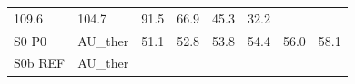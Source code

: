 \documentclass[]{article}
\begin{document}
\begin{longtable}[]{@{}llrrrrrr@{}}
\begin{minipage}[t]{0.09\columnwidth}
109.6\strut
\end{minipage} & \begin{minipage}[t]{0.09\columnwidth}\raggedleft\strut
104.7\strut
\end{minipage} & \begin{minipage}[t]{0.09\columnwidth}\raggedleft\strut
91.5\strut
\end{minipage} & \begin{minipage}[t]{0.09\columnwidth}\raggedleft\strut
66.9\strut
\end{minipage} & \begin{minipage}[t]{0.09\columnwidth}\raggedleft\strut
45.3\strut
\end{minipage} & \begin{minipage}[t]{0.09\columnwidth}\raggedleft\strut
32.2\strut
\end{minipage}\tabularnewline
\begin{minipage}[t]{0.14\columnwidth}\raggedright\strut
S0 P0\strut
\end{minipage} & \begin{minipage}[t]{0.13\columnwidth}\raggedright\strut
AU\_ther\strut
\end{minipage} & \begin{minipage}[t]{0.09\columnwidth}\raggedleft\strut
51.1\strut
\end{minipage} & \begin{minipage}[t]{0.09\columnwidth}\raggedleft\strut
52.8\strut
\end{minipage} & \begin{minipage}[t]{0.09\columnwidth}\raggedleft\strut
53.8\strut
\end{minipage} & \begin{minipage}[t]{0.09\columnwidth}\raggedleft\strut
54.4\strut
\end{minipage} & \begin{minipage}[t]{0.09\columnwidth}\raggedleft\strut
56.0\strut
\end{minipage} & \begin{minipage}[t]{0.09\columnwidth}\raggedleft\strut
58.1\strut
\end{minipage}\tabularnewline
\begin{minipage}[t]{0.14\columnwidth}\raggedright\strut
S0b REF\strut
\end{minipage} & \begin{minipage}[t]{0.13\columnwidth}\raggedright\strut
AU\_ther\strut
\end{minipage} & \begin{minipage}[t]{0.09\columnwidth}\raggedleft\strut

\end{minipage}
\end{longtable}
\end{document}

